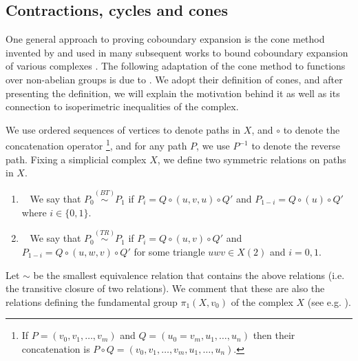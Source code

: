 \subsection{Contractions, cycles and cones} \label{sec:cones}
One general approach to proving coboundary expansion is the cone method invented by \cite{Gromov2010} and used in many subsequent works to bound coboundary expansion of various complexes \cite{LubotzkyMM2016,KaufmanM2018,KozlovM2019,KaufmanO2021,DiksteinD2023cbdry}. The following adaptation of the cone method to functions over non-abelian groups is due to \cite{DiksteinD2023swap}.   We adopt their definition of cones, and after presenting the definition, we will explain the motivation behind it as well as its connection to isoperimetric inequalities of the complex.

We use ordered sequences of vertices to denote paths in $X$, and $\circ$ to denote the concatenation operator \footnote{If $P= (v_0,v_1,\dots,v_m)$ and $Q = (u_0 = v_m,u_1,\dots,u_n)$ then their concatenation is $P\circ Q = (v_0,v_1,\dots,v_m,u_1,\dots,u_n)$.}, and for any path \(P \), we use $P^{-1}$ to denote the reverse path. 
Fixing a simplicial complex \(X\), we define two symmetric relations on paths in \(X\).
\begin{enumerate}
    \item[(BT)]~ We say that \(P_0 \overset{(BT)}{\sim} P_1\) if \(P_i = Q \circ (u,v,u) \circ Q'\) and \(P_{1-i} = Q \circ (u) \circ Q'\) where \(i\in\{0,1\}\).
    \item[(TR)]~ We say that \(P_0 \overset{(TR)}{\sim} P_1\) if \(P_{i} = Q \circ (u,v) \circ Q'\) and \(P_{1-i} = Q \circ (u,w,v) \circ Q'\) for some triangle \(uwv \in X(2)\) and \(i=0,1\).
\end{enumerate}

Let \(\sim\) be the smallest equivalence relation that contains the above relations (i.e. the transitive closure of two relations). We comment that these are also the relations defining the fundamental group \(\pi_1(X,v_0)\) of the complex $X$ (see e.g. \cite{Surowski1984}).


